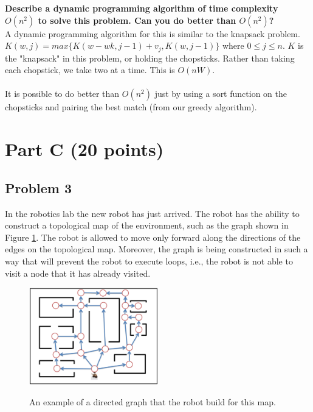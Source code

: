 \documentclass[11pt]{article}
\begin{document}
\begin{enumerate}[label=\Alph*.]
\noindent \textbf{Describe a dynamic programming algorithm of time complexity $O(n^{2})$ to solve this problem. Can you do better than $O(n^{2})$?}\\

A dynamic programming algorithm for this is similar to the knapsack problem. $K(w,j) = max\{K(w-wk,j-1) + v_j,K(w,j-1)\}$ where $0 \leq j \leq n$. $K$ is the "knapsack" in this problem, or holding the chopsticks. Rather than taking each chopstick, we take two at a time. This is $O(nW)$. \\
\\
It is possible to do better than $O(n^2)$ just by using a sort function on the chopsticks and pairing the best match (from our greedy algorithm).

\end{enumerate}

\section*{Part C (20 points)}

\subsection*{Problem 3} In the robotics lab the new robot has just
arrived. The robot has the ability to construct a topological map of
the environment, such as the graph shown in Figure
\ref{fig:problem3}. The robot is allowed to move only forward along
the directions of the edges on the topological map. Moreover, the
graph is being constructed in such a way that will prevent the robot
to execute loops, i.e., the robot is not able to visit a node that it
has already visited.\\

\begin{figure}[h]
  \centering
  \caption{An example of a directed graph that the robot build for this map.}
    \includegraphics[width=0.5\textwidth]{paths}
    \label{fig:problem3}
\end{figure}
\end{document}

